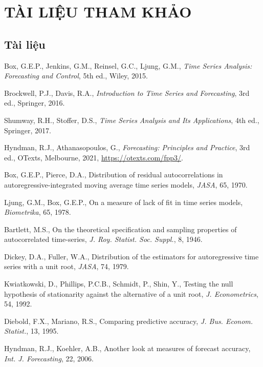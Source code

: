 \section*{TÀI LIỆU THAM KHẢO}

\begingroup
\small
\subsection*{Tài liệu}
\begin{enumerate}[label={[\arabic*]},leftmargin=1.2cm,itemsep=1pt,topsep=2pt]
\item \hypertarget{tl1}{}Box, G.E.P., Jenkins, G.M., Reinsel, G.C., Ljung, G.M., \textit{Time Series Analysis: Forecasting and Control}, 5th ed., Wiley, 2015.
\item \hypertarget{tl2}{}Brockwell, P.J., Davis, R.A., \textit{Introduction to Time Series and Forecasting}, 3rd ed., Springer, 2016.
\item \hypertarget{tl3}{}Shumway, R.H., Stoffer, D.S., \textit{Time Series Analysis and Its Applications}, 4th ed., Springer, 2017.
\item \hypertarget{tl4}{}Hyndman, R.J., Athanasopoulos, G., \textit{Forecasting: Principles and Practice}, 3rd ed., OTexts, Melbourne, 2021, \url{https://otexts.com/fpp3/}.
\item \hypertarget{tl5}{}Box, G.E.P., Pierce, D.A., Distribution of residual autocorrelations in autoregressive-integrated moving average time series models, \textit{JASA}, 65, 1970.
\item \hypertarget{tl6}{}Ljung, G.M., Box, G.E.P., On a measure of lack of fit in time series models, \textit{Biometrika}, 65, 1978.
\item \hypertarget{tl7}{}Bartlett, M.S., On the theoretical specification and sampling properties of autocorrelated time-series, \textit{J. Roy. Statist. Soc. Suppl.}, 8, 1946.
\item \hypertarget{tl8}{}Dickey, D.A., Fuller, W.A., Distribution of the estimators for autoregressive time series with a unit root, \textit{JASA}, 74, 1979.
\item \hypertarget{tl9}{}Kwiatkowski, D., Phillips, P.C.B., Schmidt, P., Shin, Y., Testing the null hypothesis of stationarity against the alternative of a unit root, \textit{J. Econometrics}, 54, 1992.
\item \hypertarget{tl10}{}Diebold, F.X., Mariano, R.S., Comparing predictive accuracy, \textit{J. Bus. Econom. Statist.}, 13, 1995.
\item \hypertarget{tl11}{}Hyndman, R.J., Koehler, A.B., Another look at measures of forecast accuracy, \textit{Int. J. Forecasting}, 22, 2006.

\end{enumerate}
